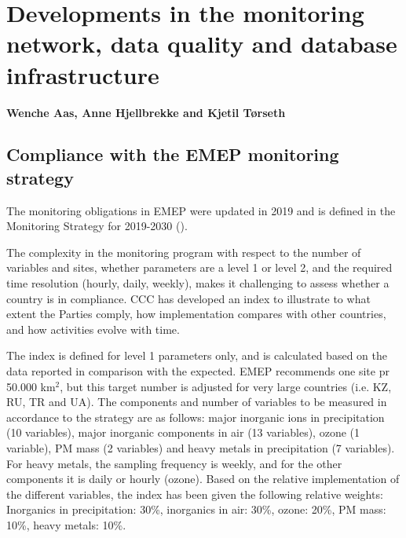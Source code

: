 \chapter[Development of measurements]{Developments in the monitoring network, data quality and database infrastructure}\label{ch:ObsDevel}

{\bf{Wenche Aas, Anne Hjellbrekke and Kjetil T{\o}rseth}}
\vspace{30pt}


\section{\label{sec:Compliance-with-monitoring}Compliance with the EMEP monitoring strategy}

The monitoring obligations in EMEP were updated in 2019 and is defined in the Monitoring Strategy for 2019-2030 (\cite{MonStrat2019}). 

The complexity in the monitoring program with respect to the number of variables and sites, whether parameters are a level 1 or level 2, and the required time resolution (hourly, daily, weekly), makes it challenging to assess whether a country is in compliance. CCC has developed an index to illustrate to what extent the Parties comply, how implementation compares with other countries, and how activities evolve with time.

The index is defined for level 1 parameters only, and is calculated based on the data reported in comparison with the expected. EMEP recommends one site pr 50.000 km$^{2}$, but this target number is adjusted for very large countries (i.e. KZ, RU, TR and UA). The components and number of variables to be measured in accordance to the strategy are as follows: major inorganic ions in precipitation (10 variables), major inorganic components in air (13 variables), ozone (1 variable), PM mass (2 variables) and heavy metals in precipitation (7 variables). For heavy metals, the sampling frequency is weekly, and for the other components it is daily or hourly (ozone). Based on the relative implementation of the different variables, the index has been given the following relative weights: Inorganics in precipitation: 30\%, inorganics in air: 30\%, ozone: 20\%, PM mass: 10\%, heavy metals: 10\%.

